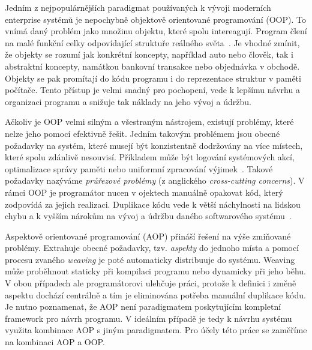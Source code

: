 Jedním z nejpopulárnějších paradigmat používaných k
vývoji moderních enterprise systémů je nepochybně
objektově orientované programování (OOP). To vnímá daný problém
jako množinu objektu, které spolu intereagují. Program
člení na malé funkční celky odpovídající struktuře
reálného světa~\cite{rentsch1982object}. Je vhodné zmínit,
že objekty se rozumí jak konkrétní koncepty, například
auto nebo člověk, tak i abstraktní koncepty,
namátkou bankovní transakce nebo objednávka v obchodě.
Objekty se pak promítají do kódu programu i do
reprezentace struktur v paměti počítače.
Tento přístup je velmi snadný pro pochopení,
vede k lepšímu návrhu a organizaci programu a snižuje
tak náklady na jeho vývoj a údržbu.

Ačkoliv je OOP velmi silným a všestraným nástrojem,
existují problémy, které nelze jeho pomocí efektivně řešit.
Jedním takovým problémem jsou obecné požadavky na systém,
které musejí být konzistentně dodržovány na více místech,
které spolu zdánlivě nesouvisí. Příkladem
může být logování systémových akcí, optimalizace správy paměti
nebo uniformní zpracování výjimek~\cite{kiczales1997aspect}.
Takové požadavky nazýváme \textit{průřezové problémy}
(z anglického \textit{cross-cutting concerns}).
V rámci OOP je programátor nucen v ojektech manuálně opakovat
kód, který zodpovídá za jejich realizaci. Duplikace kódu
vede k větší náchylnosti na lidskou chybu a k vyšším nárokům na vývoj
a údržbu daného softwarového systému~\cite{fowler1999refactoring}.

Aspektově orientované programování (AOP) přináší řešení na
výše zmiňované problémy. Extrahuje obecné požadavky,
tzv. \textit{aspekty} do jednoho místa a pomocí procesu zvaného
\textit{weaving} je poté automaticky distribuuje do systému.
Weaving může proběhnout staticky při kompilaci programu nebo dynamicky
při jeho běhu. V obou případech ale programátorovi ulehčuje práci,
protože k definici i změně aspektu dochází centrálně a tím je eliminována
potřeba manuální duplikace kódu. Je nutno poznamenat, že AOP není
paradigmatem poskytujícím kompletní framework pro návrh programu.
V ideálním případě je tedy k návrhu systému využita kombinace
AOP s jiným paradigmatem. Pro účely této práce se zaměříme na
kombinaci AOP a OOP.


